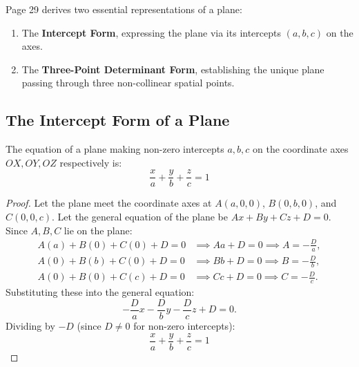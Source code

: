 \begin{conceptbox}
Page 29 derives two essential representations of a plane:
\begin{enumerate}[noitemsep]
    \item The \textbf{Intercept Form}, expressing the plane via its intercepts $(a, b, c)$ on the axes.
    \item The \textbf{Three-Point Determinant Form}, establishing the unique plane passing through three non-collinear spatial points.
\end{enumerate}
\end{conceptbox}

\subsection{The Intercept Form of a Plane}
\begin{theorembox}
The equation of a plane making non-zero intercepts $a, b, c$ on the coordinate axes $OX, OY, OZ$ respectively is:
\begin{equation}
    \boxed{\frac{x}{a} + \frac{y}{b} + \frac{z}{c} = 1}
\end{equation}
\end{theorembox}

\begin{proof}
Let the plane meet the coordinate axes at $A(a, 0, 0)$, $B(0, b, 0)$, and $C(0, 0, c)$.
Let the general equation of the plane be $Ax + By + Cz + D = 0$.
Since $A, B, C$ lie on the plane:
\begin{align}
    A(a) + B(0) + C(0) + D = 0 &\implies Aa + D = 0 \implies A = -\frac{D}{a}, \\
    A(0) + B(b) + C(0) + D = 0 &\implies Bb + D = 0 \implies B = -\frac{D}{b}, \\
    A(0) + B(0) + C(c) + D = 0 &\implies Cc + D = 0 \implies C = -\frac{D}{c}.
\end{align}
Substituting these into the general equation:
\begin{equation}
    -\frac{D}{a}x - \frac{D}{b}y - \frac{D}{c}z + D = 0.
\end{equation}
Dividing by $-D$ (since $D \neq 0$ for non-zero intercepts):
\begin{equation}
    \boxed{\frac{x}{a} + \frac{y}{b} + \frac{z}{c} = 1}
\end{equation}
\end{proof}

